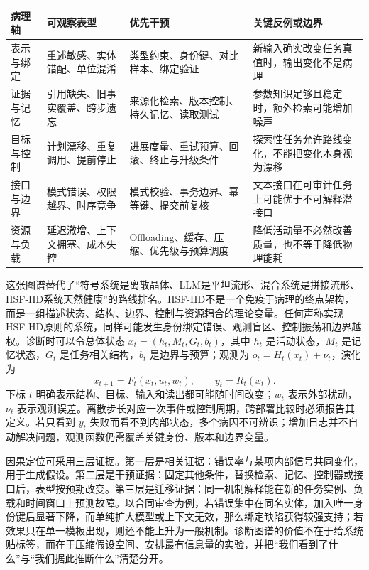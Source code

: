 \begin{table}[htbp]
\centering
\small
\begin{tabularx}{\textwidth}{p{2.2cm} X X X}
\toprule
\rowcolor{structurecolor!20}
\textbf{病理轴} & \textbf{可观察表型} & \textbf{优先干预} & \textbf{关键反例或边界} \\
\midrule
表示与绑定 & 重述敏感、实体错配、单位混淆 & 类型约束、身份键、对比样本、绑定验证 & 新输入确实改变任务真值时，输出变化不是病理 \\
证据与记忆 & 引用缺失、旧事实覆盖、跨步遗忘 & 来源化检索、版本控制、持久记忆、读取测试 & 参数知识足够且稳定时，额外检索可能增加噪声 \\
目标与控制 & 计划漂移、重复调用、提前停止 & 进展度量、重试预算、回滚、终止与升级条件 & 探索性任务允许路线变化，不能把变化本身视为漂移 \\
接口与边界 & 模式错误、权限越界、时序竞争 & 模式校验、事务边界、幂等键、提交前复核 & 文本接口在可审计任务上可能优于不可解释潜接口 \\
资源与负载 & 延迟激增、上下文拥塞、成本失控 & Offloading、缓存、压缩、优先级与预算调度 & 降低活动量不必然改善质量，也不等于降低物理能耗 \\
\bottomrule
\end{tabularx}
\end{table}

这张图谱替代了“符号系统是离散晶体、LLM是平坦流形、混合系统是拼接流形、HSF-HD系统天然健康”的路线排名。HSF-HD不是一个免疫于病理的终点架构，而是一组描述状态、结构、边界、控制与资源耦合的理论变量。任何声称实现HSF-HD原则的系统，同样可能发生身份绑定错误、观测盲区、控制振荡和边界越权。诊断时可以令总体状态 \(x_t=(h_t,M_t,G_t,b_t)\)，其中 \(h_t\) 是活动状态，\(M_t\) 是记忆状态，\(G_t\) 是任务相关结构，\(b_t\) 是边界与预算；观测为 \(o_t=H_t(x_t)+\nu_t\)，演化为
\[
  x_{t+1}=F_t(x_t,u_t,w_t),\qquad
  y_t=R_t(x_t).
\]
下标 \(t\) 明确表示结构、目标、输入和读出都可能随时间改变；\(w_t\) 表示外部扰动，\(\nu_t\) 表示观测误差。离散步长对应一次事件或控制周期，跨部署比较时必须报告其定义。若只看到 \(y_t\) 失败而看不到内部状态，多个病因不可辨识；增加日志并不自动解决问题，观测函数仍需覆盖关键身份、版本和边界变量。

因果定位可采用三层证据。第一层是相关证据：错误率与某项内部信号共同变化，用于生成假设。第二层是干预证据：固定其他条件，替换检索、记忆、控制器或接口后，表型按预期改变。第三层是迁移证据：同一机制解释能在新的任务实例、负载和时间窗口上预测故障。以合同审查为例，若错误集中在同名实体，加入唯一身份键后显著下降，而单纯扩大模型或上下文无效，那么绑定缺陷获得较强支持；若效果只在单一模板出现，则还不能上升为一般机制。诊断图谱的价值不在于给系统贴标签，而在于压缩假设空间、安排最有信息量的实验，并把“我们看到了什么”与“我们据此推断什么”清楚分开。

